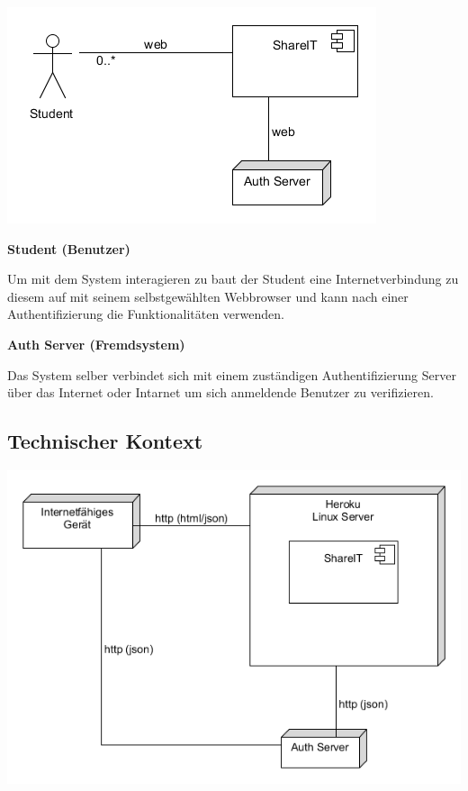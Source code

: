 \documentclass[]{report}
\begin{document}
\begin{center}
\includegraphics{images/Fachlicher Kontext.png}
\end{center}
\textbf{Student (Benutzer)}

Um mit dem System interagieren zu baut der Student eine Internetverbindung zu diesem auf mit seinem
selbstgewählten Webbrowser und kann nach einer Authentifizierung die Funktionalitäten verwenden.

\textbf{Auth Server (Fremdsystem)}

Das System selber verbindet sich mit einem zuständigen Authentifizierung Server über das Internet oder Intarnet
um sich anmeldende Benutzer zu verifizieren.

\newpage

\subsection{Technischer Kontext}\label{_technischer_kontext}

\begin{center}
\includegraphics{images/Technischer Kontext.png}
\end{center}
\end{document}
